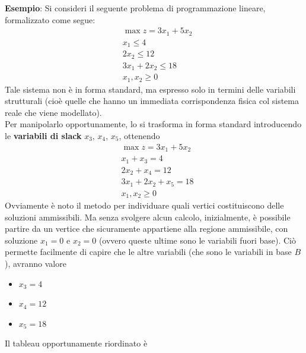 \documentclass[a4paper]{extarticle}
\begin{document}
\vspace{1em}
\noindent
\textbf{Esempio}: Si consideri il seguente problema di programmazione lineare, formalizzato come segue:
\begin{align*}
    &\max z = 3 x_1 + 5x_2\\
    &x_1 \leq 4\\
    &2x_2 \leq 12\\
    &3x_1 + 2x_2 \leq 18\\
    &x_1,x_2 \geq 0
\end{align*}
Tale sistema non è in forma standard, ma espresso solo in termini delle variabili strutturali (cioè quelle che hanno un immediata corrispondenza fisica col sistema reale che viene modellato).\\
Per manipolarlo opportunamente, lo si trasforma in forma standard introducendo le \textbf{variabili di slack} $x_3$, $x_4$, $x_5$, ottenendo
\begin{align*}
    &\max z = 3 x_1 + 5x_2\\
    &x_1 + x_3 = 4\\
    &2x_2 + x_4 = 12\\
    &3x_1 + 2x_2 + x_5 = 18\\
    &x_1,x_2 \geq 0
\end{align*}
Ovviamente è noto il metodo per individuare quali vertici costituiscono delle soluzioni ammissibili. Ma senza svolgere alcun calcolo, inizialmente, è possibile partire da un vertice che sicuramente appartiene alla regione ammissibile, con soluzione $x_1=0$ e $x_2=0$ (ovvero queste ultime sono le variabili fuori base). Ciò permette facilmente di capire che le altre variabili (che sono le variabili in base $B$), avranno valore
\begin{itemize}
    \item $x_3=4$
    \item $x_4=12$
    \item $x_5=18$
\end{itemize}
Il tableau opportunamente riordinato è
\vspace{1em}
\noindent
\end{document}
